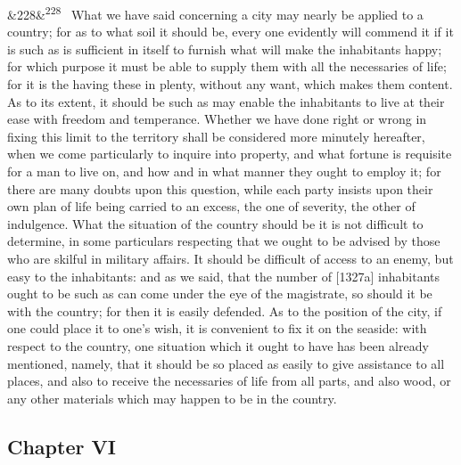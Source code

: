 \documentclass[12pt]{article}
\newcommand{\para}[1][]{\par\noindent\ifx&#1&\else\textsuperscript{\footnotesize #1}~\fi}
\begin{document}
\para[228] What we have said concerning a city may nearly be applied to a country; for as to what soil it should be, every one evidently will commend it if it is such as is sufficient in itself to furnish what will make the inhabitants happy; for which purpose it must be able to supply them with all the necessaries of life; for it is the having these in plenty, without any want, which makes them content. As to its extent, it should be such as may enable the inhabitants to live at their ease with freedom and temperance. Whether we have done right or wrong in fixing this limit to the territory shall be considered more minutely hereafter, when we come particularly to inquire into property, and what fortune is requisite for a man to live on, and how and in what manner they ought to employ it; for there are many doubts upon this question, while each party insists upon their own plan of life being carried to an excess, the one of severity, the other of indulgence. What the situation of the country should be it is not difficult to determine, in some particulars respecting that we ought to be advised by those who are skilful in military affairs. It should be difficult of access to an enemy, but easy to the inhabitants: and as we said, that the number of [1327a] inhabitants ought to be such as can come under the eye of the magistrate, so should it be with the country; for then it is easily defended. As to the position of the city, if one could place it to one's wish, it is convenient to fix it on the seaside: with respect to the country, one situation which it ought to have has been already mentioned, namely, that it should be so placed as easily to give assistance to all places, and also to receive the necessaries of life from all parts, and also wood, or any other materials which may happen to be in the country.

\subsection*{Chapter VI}
\end{document}
